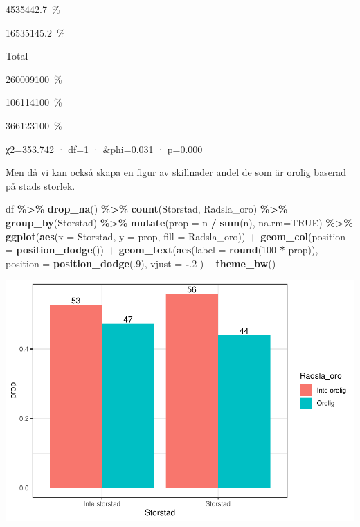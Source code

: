 \documentclass[
]{book}
\newenvironment{Shaded}{\begin{snugshade}}{\end{snugshade}}
\newcommand{\AttributeTok}[1]{\textcolor[rgb]{0.13,0.29,0.53}{#1}}
\newcommand{\ConstantTok}[1]{\textcolor[rgb]{0.56,0.35,0.01}{#1}}
\newcommand{\DecValTok}[1]{\textcolor[rgb]{0.00,0.00,0.81}{#1}}
\newcommand{\FunctionTok}[1]{\textcolor[rgb]{0.13,0.29,0.53}{\textbf{#1}}}
\newcommand{\NormalTok}[1]{#1}
\newcommand{\SpecialCharTok}[1]{\textcolor[rgb]{0.81,0.36,0.00}{\textbf{#1}}}
\begin{document}
{45354}{42.7~\%}

{165351}{45.2~\%}

Total

{260009}{100~\%}

{106114}{100~\%}

{366123}{100~\%}

χ2=353.742 · df=1 · \&phi=0.031 · p=0.000

Men då vi kan också skapa en figur av skillnader andel de som är orolig baserad på stads storlek.

\begin{Shaded}
\begin{Highlighting}[]
\NormalTok{df }\SpecialCharTok{\%\textgreater{}\%}
  \FunctionTok{drop\_na}\NormalTok{() }\SpecialCharTok{\%\textgreater{}\%} 
  \FunctionTok{count}\NormalTok{(Storstad, Radsla\_oro) }\SpecialCharTok{\%\textgreater{}\%} 
  \FunctionTok{group\_by}\NormalTok{(Storstad) }\SpecialCharTok{\%\textgreater{}\%}
  \FunctionTok{mutate}\NormalTok{(}\AttributeTok{prop =}\NormalTok{ n }\SpecialCharTok{/} \FunctionTok{sum}\NormalTok{(n), }\AttributeTok{na.rm=}\ConstantTok{TRUE}\NormalTok{) }\SpecialCharTok{\%\textgreater{}\%}
  \FunctionTok{ggplot}\NormalTok{(}\FunctionTok{aes}\NormalTok{(}\AttributeTok{x =}\NormalTok{ Storstad, }\AttributeTok{y =}\NormalTok{ prop, }\AttributeTok{fill =}\NormalTok{ Radsla\_oro)) }\SpecialCharTok{+}
  \FunctionTok{geom\_col}\NormalTok{(}\AttributeTok{position =} \FunctionTok{position\_dodge}\NormalTok{()) }\SpecialCharTok{+}
  \FunctionTok{geom\_text}\NormalTok{(}\FunctionTok{aes}\NormalTok{(}\AttributeTok{label =} \FunctionTok{round}\NormalTok{(}\DecValTok{100} \SpecialCharTok{*}\NormalTok{ prop)),}
            \AttributeTok{position =} \FunctionTok{position\_dodge}\NormalTok{(.}\DecValTok{9}\NormalTok{), }\AttributeTok{vjust =} \SpecialCharTok{{-}}\NormalTok{.}\DecValTok{2}
\NormalTok{  )}\SpecialCharTok{+}
  \FunctionTok{theme\_bw}\NormalTok{()}
\end{Highlighting}
\end{Shaded}

\includegraphics{_main_files/figure-latex/unnamed-chunk-21-1.pdf}

  
\end{document}
